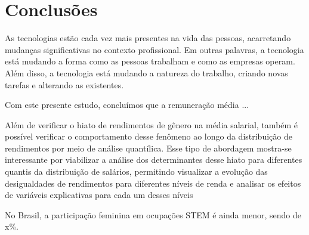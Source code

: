 \section{Conclusões}

As tecnologias estão cada vez mais presentes na vida das pessoas, acarretando mudanças significativas no contexto profissional. Em outras palavras, a tecnologia está mudando a forma como as pessoas trabalham e como as empresas operam. Além disso, a tecnologia está mudando a natureza do trabalho, criando novas tarefas e alterando as existentes.

Com este presente estudo, concluímos que a remuneração média ...

Além de verificar o hiato de rendimentos de gênero na média salarial, também
é possível verificar o comportamento desse fenômeno ao longo da distribuição de
rendimentos por meio de análise quantílica. Esse tipo de abordagem mostra-se interessante por viabilizar a análise dos determinantes desse hiato para diferentes quantis da distribuição de salários, permitindo visualizar a evolução das desigualdades de rendimentos para diferentes níveis de renda e analisar os efeitos de variáveis explicativas para cada um desses níveis

No Brasil, a participação feminina em ocupações STEM é ainda menor, sendo de x\%.
